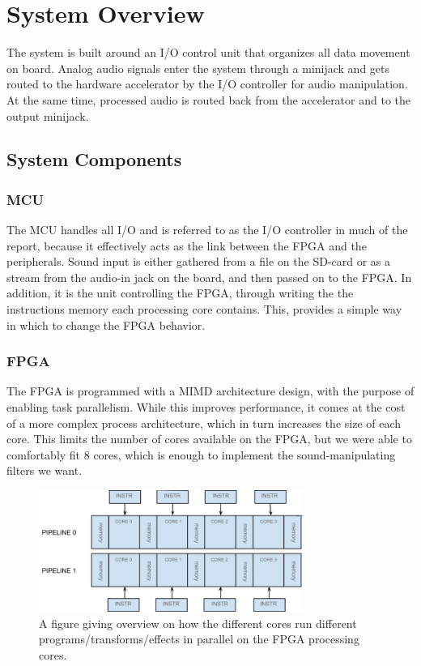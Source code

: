 \section{System Overview}

The system is built around an I/O control unit that organizes all data movement
on board. Analog audio signals enter the system through a minijack and gets
routed to the hardware accelerator by the I/O controller for audio manipulation.
At the same time, processed audio is routed back from the accelerator and to the
output minijack.

\subsection{System Components}
\subsubsection{MCU}\label{intro:system-components-mcu}

The MCU handles all I/O and is referred to as the I/O controller in much of the
report, because it effectively acts as the link between the FPGA and the
peripherals. Sound input is either gathered from a file on the SD-card or as a
stream from the audio-in jack on the board, and then passed on to the FPGA. In
addition, it is the unit controlling the FPGA, through writing the the
instructions memory each processing core contains. This, provides a simple way
in which to change the FPGA behavior.

\subsubsection{FPGA}

The FPGA is programmed with a MIMD architecture design, with the purpose of
enabling task parallelism. While this improves performance, it comes at the cost
of a more complex process architecture, which in turn increases the size of each
core. This limits the number of cores available on the FPGA, but we were able to
comfortably fit 8 cores, which is enough to implement the sound-manipulating
filters we want.

\begin{figure}[H]
    \centering
    \includegraphics[height=150px]{figures/fpga/system_components_general_pipeline_without_programs.png}
    \caption{A figure giving overview on how the different cores run
different programs/transforms/effects in parallel on the FPGA processing cores.}
    \label{fig:general_pipeline}
\end{figure}

